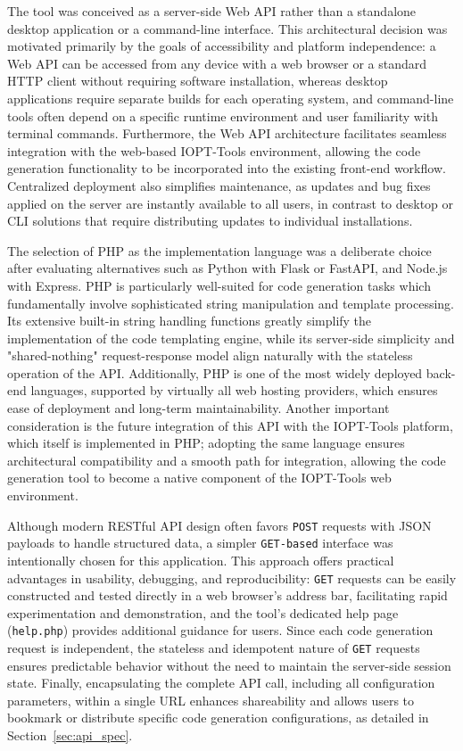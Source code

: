 The tool was conceived as a server-side Web API rather than a standalone desktop application or a command-line interface. This architectural decision was motivated primarily by the goals of accessibility and platform independence: a Web API can be accessed from any device with a web browser or a standard HTTP client without requiring software installation, whereas desktop applications require separate builds for each operating system, and command-line tools often depend on a specific runtime environment and user familiarity with terminal commands. Furthermore, the Web API architecture facilitates seamless integration with the web-based IOPT-Tools environment, allowing the code generation functionality to be incorporated into the existing front-end workflow. Centralized deployment also simplifies maintenance, as updates and bug fixes applied on the server are instantly available to all users, in contrast to desktop or CLI solutions that require distributing updates to individual installations.

The selection of PHP as the implementation language was a deliberate choice after evaluating alternatives such as Python with Flask or FastAPI, and Node.js with Express. PHP is particularly well-suited for code generation tasks which fundamentally involve sophisticated string manipulation and template processing. Its extensive built-in string handling functions greatly simplify the implementation of the code templating engine, while its server-side simplicity and "shared-nothing" request-response model align naturally with the stateless operation of the API. Additionally, PHP is one of the most widely deployed back-end languages, supported by virtually all web hosting providers, which ensures ease of deployment and long-term maintainability. Another important consideration is the future integration of this API with the IOPT-Tools platform, which itself is implemented in PHP; adopting the same language ensures architectural compatibility and a smooth path for integration, allowing the code generation tool to become a native component of the IOPT-Tools web environment.

Although modern RESTful API design often favors \texttt{POST} requests with JSON payloads to handle structured data, a simpler \texttt{GET-based} interface was intentionally chosen for this application. This approach offers practical advantages in usability, debugging, and reproducibility: \texttt{GET} requests can be easily constructed and tested directly in a web browser's address bar, facilitating rapid experimentation and demonstration, and the tool's dedicated help page (\texttt{help.php}) provides additional guidance for users. Since each code generation request is independent, the stateless and idempotent nature of \texttt{GET} requests ensures predictable behavior without the need to maintain the server-side session state. Finally, encapsulating the complete API call, including all configuration parameters, within a single URL enhances shareability and allows users to bookmark or distribute specific code generation configurations, as detailed in Section~\ref{sec:api_spec}.

